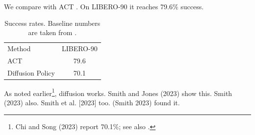 \documentclass{article}
\begin{document}
We compare with ACT \citep{act}. On LIBERO-90 it reaches 79.6\% success.

\begin{table}
\caption{Success rates. Baseline numbers are taken from \citet{lib}.}
\begin{tabular}{lc}
Method & LIBERO-90 \\
ACT & 79.6 \\
Diffusion Policy \citep{dp} & 70.1 \\
\end{tabular}
\end{table}

As noted earlier\footnote{Chi and Song (2023) report 70.1\%; see also \citet{dp}.}, diffusion works.
Smith and Jones (2023) show this. Smith (2023) also. Smith et al. [2023] too. (Smith 2023) found it.


\end{document}
